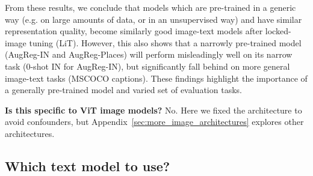 \documentclass[10pt,twocolumn,letterpaper]{article}
\makeatletter
\def \lit {LiT\xspace}
\renewcommand*{\eg}{e.g.\@\xspace}
\makeatother
\begin{document}
From these results, we conclude that models which are pre-trained in a generic way (\eg on large amounts of data, or in an unsupervised way) and have similar representation quality, become similarly good image-text models after locked-image tuning (\lit).
However, this also shows that a narrowly pre-trained model (AugReg-IN and AugReg-Places) will perform misleadingly well on its narrow task (0-shot IN for AugReg-IN), but significantly fall behind on more general image-text tasks (MSCOCO captions).
These findings highlight the importance of a generally pre-trained model and varied set of evaluation tasks.

\textbf{Is this specific to ViT image models?} No. Here we fixed the architecture to avoid confounders, but Appendix~\ref{sec:more_image_architectures} explores other architectures.



\subsection{Which text model to use?}
\label{sec:more_text_models}
\end{document}
